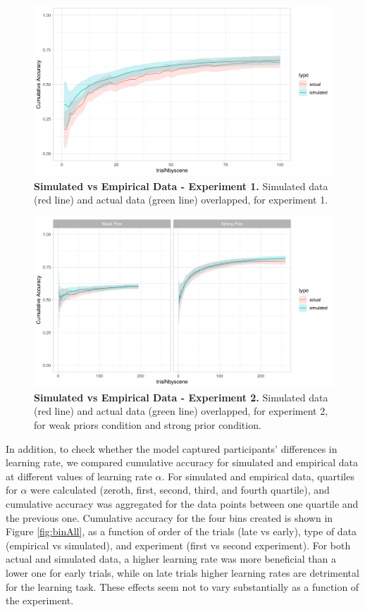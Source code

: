 \documentclass[a4paper,12pt]{article}
\begin{document}
\begin{figure}[ht!]
\centerline
{\includegraphics[width=1\textwidth]{figures/SimulatedVsActual.exp=exp1.mod=fLR_Instr.png}}
\caption{\textbf{Simulated vs Empirical Data - Experiment 1.} Simulated data (red line) and actual data (green line) overlapped, for experiment 1.}
\label{fig:simvsemp_Exp1}
\end{figure}

\begin{figure}[ht!]
\centerline
{\includegraphics[width=1.5\textwidth]{figures/SimulatedVsActual.exp=exp2.mod=fLR_Instr.png}}
\caption{\textbf{Simulated vs Empirical Data - Experiment 2.} Simulated data (red line) and actual data (green line) overlapped, for experiment 2, for weak priors condition and strong prior condition. }
\label{fig:simvsemp_Exp2}
\end{figure}

In addition, to check whether the model captured participants' differences in learning rate, we compared cumulative accuracy for simulated and empirical data at different values of learning rate $\alpha$. For simulated and empirical data, quartiles for $\alpha$ were calculated (zeroth, first, second, third, and fourth quartile), and cumulative accuracy was aggregated for the data points between one quartile and the previous one. Cumulative accuracy for the four bins created is shown in Figure \ref{fig:binAll}, as a function of order of the trials (late vs early), type of data (empirical vs simulated), and experiment (first vs second experiment). For both actual and simulated data, a higher learning rate was more beneficial than a lower one for early trials, while on late trials higher learning rates are detrimental for the learning task. These effects seem not to vary substantially as a function of the experiment. 
\end{document}

